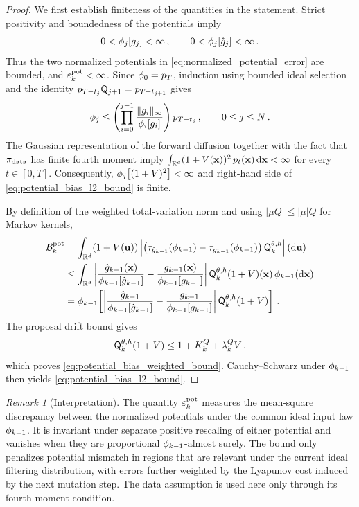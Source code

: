 \documentclass[11pt]{article}
\theoremstyle{plain}
\theoremstyle{definition}
\theoremstyle{remark}
\newtheorem{remark}[theorem]{Remark}
\begin{document}
\begin{proof}
We first establish finiteness of the quantities in the statement.
Strict positivity and boundedness of the potentials imply
$$
0<\filter{j}[\pot{j}]<\infty \eqsp, \qquad 0 < \filter{j}[\approxpot{j}]<\infty \eqsp.
$$
Thus the two normalized potentials in \eqref{eq:normalized_potential_error} are bounded, and $\varepsilon_k^{\rm pot} < \infty$. Since $\filter{0}=p_T$, induction using bounded ideal selection
and the identity
$p_{T-t_j}\mk{j+1}=p_{T-t_{j+1}}$ gives
$$
\filter{j} \le \left( \prod_{i=0}^{j-1} \frac{\|\pot{i}\|_\infty}{\filter{i}[\pot{i}]} \right)p_{T-t_j} \eqsp, \qquad 0\le j\le N \eqsp.
$$
The Gaussian representation of the forward diffusion together with the fact that $\pi_{\mathrm{data}}$ has finite fourth moment imply $\int_{\mathbb{R}^d} (1+V(\mathbf{x}))^2\,p_t(\mathbf{x})\,\mathrm{d} \mathbf{x} < \infty$ for every $t\in[0,T]$.
Consequently, $\filter{j}[(1+V)^2]<\infty$ and right-hand side of \eqref{eq:potential_bias_l2_bound} is finite.

By definition of the weighted total-variation norm and using
$|\mu Q|\le |\mu|Q$ for Markov kernels,
\begin{align*}
\mathcal B_k^{\rm pot}
&= \int_{\rset^\xdim} (1+V(\mathbf{u})) \left| \left( \tau_{\approxpot{k-1}}(\filter{k-1}) - \tau_{\pot{k-1}}(\filter{k-1}) \right) \mk{k} [\theta,h] \right|(\rmd \mathbf{u}) \\
&\le \int_{\rset^\xdim} \left| \frac{\approxpot{k-1}(\x)}{\filter{k-1}[\approxpot{k-1}]} - \frac{\pot{k-1}(\x)}{\filter{k-1}[\pot{k-1}]} \right|
\mk{k}[\theta,h](1+V)(\x)\, \filter{k-1}(\rmd\x) \\
&= \filter{k-1}\!\left[ \left| \frac{\approxpot{k-1}}{\filter{k-1}[\approxpot{k-1}]} - \frac{\pot{k-1}}{\filter{k-1}[\pot{k-1}]} \right| \mk{k}[\theta,h](1+V) \right] \eqsp.
\end{align*}
%
The proposal drift bound gives
$$
\mk{k}[\theta,h](1+V) \le 1 + K_k^Q + \lambda_k^Q V \eqsp,
$$
which proves \eqref{eq:potential_bias_weighted_bound}. Cauchy--Schwarz under $\filter{k-1}$ then yields \eqref{eq:potential_bias_l2_bound}.
\end{proof}


\begin{remark}[Interpretation]
The quantity $\varepsilon_k^{\rm pot}$ measures the mean-square discrepancy between the normalized potentials under the common
ideal input law $\filter{k-1}$. It is invariant under separate positive rescaling of either potential and vanishes when they are proportional
$\filter{k-1}$-almost surely. The bound only penalizes potential mismatch in regions that are
relevant under the current ideal filtering distribution, with errors further weighted by the Lyapunov cost induced by the next
mutation step. The data assumption is used here only through its fourth-moment condition.
\end{remark}
\end{document}
